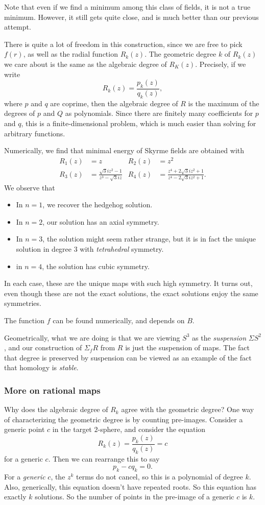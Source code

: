 \documentclass[a4paper]{article}
\begin{document}
Note that even if we find a minimum among this class of fields, it is not a true minimum. However, it still gets quite close, and is much better than our previous attempt.

There is quite a lot of freedom in this construction, since we are free to pick $f(r)$, as well as the radial function $R_k(z)$. The geometric degree $k$ of $R_k(z)$ we care about is the same as the algebraic degree of $R_K(z)$. Precisely, if we write
\[
  R_k(z) = \frac{p_k(z)}{q_k(z)},
\]
where $p$ and $q$ are coprime, then the algebraic degree of $R$ is the maximum of the degrees of $p$ and $Q$ as polynomials. Since there are finitely many coefficients for $p$ and $q$, this is a finite-dimensional problem, which is much easier than solving for arbitrary functions.

Numerically, we find that minimal energy of Skyrme fields are obtained with
\begin{align*}
  R_1(z) &= z & R_2(z) &= z^2\\
  R_3(z) &= \frac{\sqrt{3}i z^2 - 1}{z^3 - \sqrt{3}i z} & R_4(z) &= \frac{z^4 + 2\sqrt{3} i z^2 + 1}{z^4 - 2\sqrt{3} i z^2 + 1}.
\end{align*}
We observe that
\begin{itemize}
  \item In $n = 1$, we recover the hedgehog solution.
  \item In $n = 2$, our solution has an axial symmetry.
  \item In $n = 3$, the solution might seem rather strange, but it is in fact the unique solution in degree $3$ with \emph{tetrahedral} symmetry.
  \item in $n = 4$, the solution has cubic symmetry.
\end{itemize}
In each case, these are the unique maps with such high symmetry. It turns out, even though these are not the exact solutions, the exact solutions enjoy the same symmetries.

The function $f$ can be found numerically, and depends on $B$.

Geometrically, what we are doing is that we are viewing $S^3$ as the \emph{suspension} $\Sigma S^2$, and our construction of $\Sigma_f R$ from $R$ is just the suspension of maps. The fact that degree is preserved by suspension can be viewed as an example of the fact that homology is \emph{stable}.

\subsubsection*{More on rational maps}
Why does the algebraic degree of $R_k$ agree with the geometric degree? One way of characterizing the geometric degree is by counting pre-images. Consider a generic point $c$ in the target $2$-sphere, and consider the equation
\[
  R_k(z) = \frac{p_k(z)}{q_k(z)} = c
\]
for a generic $c$. Then we can rearrange this to say
\[
  p_k - c q_k = 0.
\]
For a \emph{generic} $c$, the $z^k$ terms do not cancel, so this is a polynomial of degree $k$. Also, generically, this equation doesn't have repeated roots. So this equation has exactly $k$ solutions. So the number of points in the pre-image of a generic $c$ is $k$.
\end{document}

